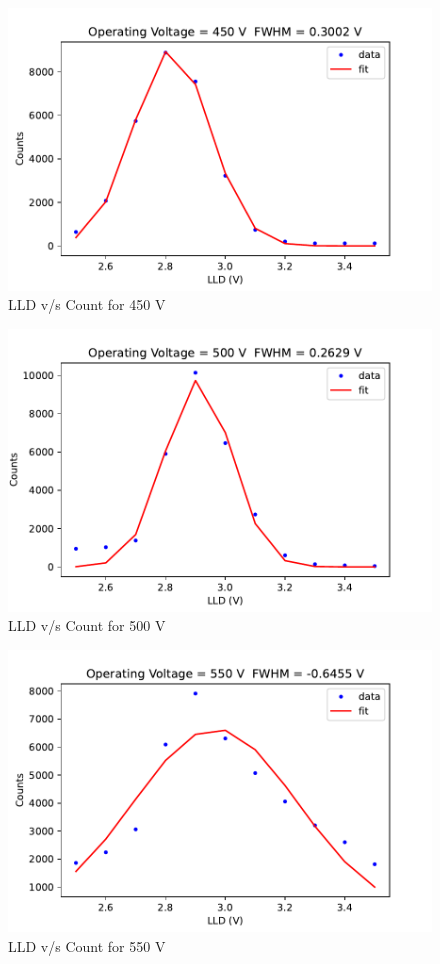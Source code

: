 \documentclass[a4paper, amsfonts, amssymb, amsmath, reprint, showkeys, nofootinbib, twoside]{revtex4-1}
\begin{document}
\begin{figure}[H]
	\centering
	\includegraphics[scale=0.6]{2}
	\caption{LLD v/s Count for 450 V}
\end{figure}

\begin{figure}[H]
	\centering
	\includegraphics[scale=0.6]{3}
	\caption{LLD v/s Count for 500 V}
\end{figure}

\begin{figure}[H]
	\centering
	\includegraphics[scale=0.6]{4}
	\caption{LLD v/s Count for 550 V}
\end{figure}
\end{document}
